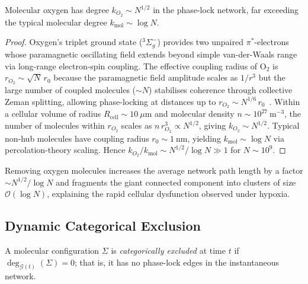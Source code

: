 \begin{theorem}
\label{thm:ch03-O2-hub}
Molecular oxygen has degree $k_{O_2}\sim N^{1/2}$ in the phase-lock network,
far exceeding the typical molecular degree $k_{\mathrm{mol}}\sim\log N$.
\end{theorem}

\begin{proof}
Oxygen's triplet ground state ($^3\Sigma_g^-$) provides two unpaired
$\pi^*$-electrons whose paramagnetic oscillating field extends beyond simple
van-der-Waals range via long-range electron-spin coupling.  The effective
coupling radius of O$_2$ is $r_{O_2}\sim\sqrt{N}\,r_0$ because the
paramagnetic field amplitude scales as $1/r^3$ but the large number of
coupled molecules ($\sim N$) stabilises coherence through collective Zeman
splitting, allowing phase-locking at distances up to
$r_{O_2}\sim N^{1/6}\,r_0$~\citep{herzberg1950molecular}.  Within a
cellular volume of radius $R_{\mathrm{cell}}\sim 10~\mu\mathrm{m}$ and
molecular density $n\sim 10^{27}~\mathrm{m}^{-3}$, the number of molecules
within $r_{O_2}$ scales as $n\,r_{O_2}^3\propto N^{1/2}$, giving
$k_{O_2}\sim N^{1/2}$.  Typical non-hub molecules have coupling radius
$r_0\sim 1~\mathrm{nm}$, yielding $k_{\mathrm{mol}}\sim\log N$ via
percolation-theory scaling.  Hence $k_{O_2}/k_{\mathrm{mol}}\sim
N^{1/2}/\log N\gg 1$ for $N\sim 10^9$.
\end{proof}

\begin{corollary}
\label{cor:ch03-hypoxia-fragmentation}
Removing oxygen molecules increases the average network path length by a
factor $\sim N^{1/2}/\log N$ and fragments the giant connected component into
clusters of size $\mathcal{O}(\log N)$, explaining the rapid cellular
dysfunction observed under hypoxia.
\end{corollary}

\subsection{Dynamic Categorical Exclusion}

\begin{definition}
\label{def:ch03-cat-exclusion}
A molecular configuration $\Sigma$ is \emph{categorically excluded} at time
$t$ if $\deg_{\mathcal{G}(t)}(\Sigma)=0$; that is, it has no phase-lock
edges in the instantaneous network.
\end{definition}

